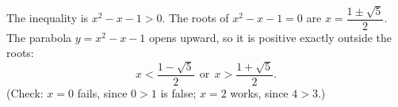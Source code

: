 The inequality is $x^2-x-1>0$. The roots of $x^2-x-1=0$ are $x=\dfrac{1\pm\sqrt5}{2}$. The parabola $y=x^2-x-1$ opens upward, so it is positive exactly outside the roots:
\[
\boxed{x<\dfrac{1-\sqrt5}{2}\ \ \text{or}\ \ x>\dfrac{1+\sqrt5}{2}}.
\]
(Check: $x=0$ fails, since $0>1$ is false; $x=2$ works, since $4>3$.)
